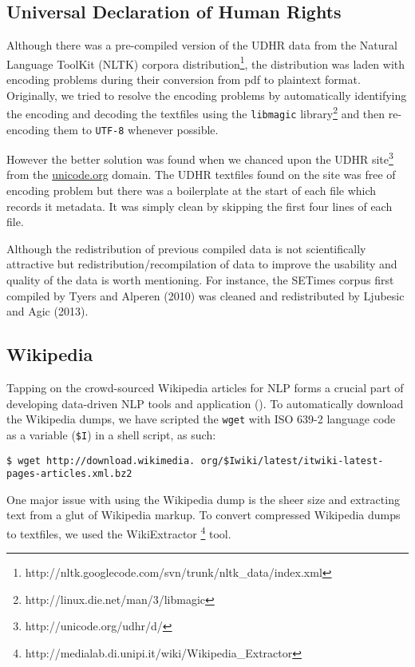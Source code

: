 \documentclass[11pt]{article}
\begin{document}
\subsection{Universal Declaration of Human Rights}

Although there was a pre-compiled version of the UDHR data from the Natural Language ToolKit (NLTK) corpora distribution\footnote{http://nltk.googlecode.com/svn/trunk/nltk\_data/index.xml}, the distribution was laden with encoding problems during their conversion from pdf to plaintext format. Originally, we tried to resolve the encoding problems by automatically identifying the encoding and decoding the textfiles using the \texttt{libmagic} library\footnote{http://linux.die.net/man/3/libmagic} and then re-encoding them to \texttt{UTF-8} whenever possible. 

However the better solution was found when we chanced upon the UDHR site\footnote{http://unicode.org/udhr/d/} from the \url{unicode.org} domain. The UDHR textfiles found on the site was free of encoding problem but there was a boilerplate at the start of each file which records it metadata. It was simply clean by skipping the first four lines of each file. 

Although the redistribution of previous compiled data is not scientifically attractive but redistribution/recompilation of data to improve the usability and quality of the data is worth mentioning. For instance, the SETimes corpus first compiled by Tyers and Alperen (2010) was cleaned and redistributed by Ljubesic and Agic (2013).

\subsection{Wikipedia}

Tapping on the crowd-sourced Wikipedia articles for NLP forms a crucial part of developing data-driven NLP tools and application ({\color{red}{citation neeeded}}). To automatically download the Wikipedia dumps, we have scripted the \texttt{wget} with ISO 639-2 language code as a variable (\texttt{\$I}) in a shell script, as such:

\smallskip
\noindent \texttt{\$ wget http://download.wikimedia.
org/\$Iwiki/latest/itwiki-latest-
pages-articles.xml.bz2}
\medskip

\noindent One major issue with using the Wikipedia dump is the sheer size and extracting text from a glut of Wikipedia markup. To convert compressed Wikipedia dumps to textfiles, we used the WikiExtractor \footnote{http://medialab.di.unipi.it/wiki/Wikipedia\_Extractor} tool.
\end{document}
